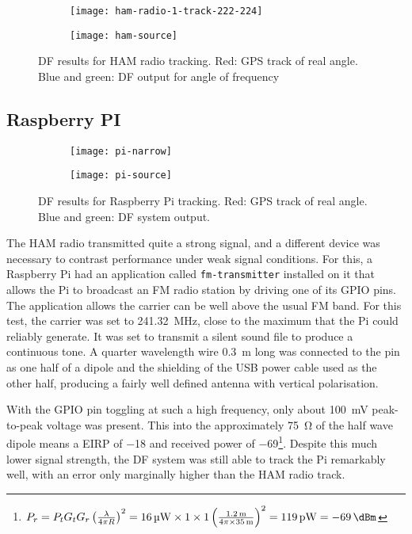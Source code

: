 \begin{figure}
  \centering
  \begin{subfigure}[b]{0.77\textwidth}
    \centering
    \texttt{[image: ham-radio-1-track-222-224]}
  \end{subfigure}
  \begin{subfigure}[b]{0.22\textwidth}
    \centering
    \texttt{[image: ham-source]}
  \end{subfigure}
  \caption{DF results for HAM radio tracking. Red: GPS track of real angle. Blue and green: DF output for angle of frequency}
  \label{fig:field-trials:ham-source}
\end{figure}

\subsection{Raspberry PI}
\begin{figure}
  \centering
  \begin{subfigure}[b]{0.77\textwidth}
    \centering
    \texttt{[image: pi-narrow]}
  \end{subfigure}
  \begin{subfigure}[b]{0.22\textwidth}
    \centering
    \texttt{[image: pi-source]}
    \vspace{2em}
  \end{subfigure}
  \caption{DF results for Raspberry Pi tracking. Red: GPS track of real angle. Blue and green: DF system output.}
  \label{fig:field-trials:ham-source}
\end{figure}
The HAM radio transmitted quite a strong signal, and a different device was necessary to contrast performance under weak signal conditions. For this, a Raspberry Pi had an application called \lstinline{fm-transmitter} installed on it that allows the Pi to broadcast an FM radio station by driving one of its GPIO pins. The application allows the carrier can be well above the usual FM band. For this test, the carrier was set to \SI{241.32}{\mega\hertz}, close to the maximum that the Pi could reliably generate. It was set to transmit a silent sound file to produce a continuous tone. A quarter wavelength wire \SI{0.3}{\metre} long was connected to the pin as one half of a dipole and the shielding of the USB power cable used as the other half, producing a fairly well defined antenna with vertical polarisation.

With the GPIO pin toggling at such a high frequency, only about \SI{100}{\milli\volt} peak-to-peak voltage was present. This into the approximately \SI{75}{\ohm} of the half wave dipole means a EIRP of \SI{-18}{\dBm} and received power of \SI{-69}{\dBm}\footnote{\(P_r = P_t G_t G_r \left( \frac{\lambda}{4 \pi R} \right)^2 = \SI{16}{\micro\watt} \times 1 \times 1 \left( \frac{\SI{1.2}{\meter}}{4 \pi \times \SI{35}{\meter}} \right)^2 = \SI{119}{\pico\watt} = \SI{-69}{\dBm}\)}. Despite this much lower signal strength, the DF system was still able to track the Pi remarkably well, with an error only marginally higher than the HAM radio track.\\

